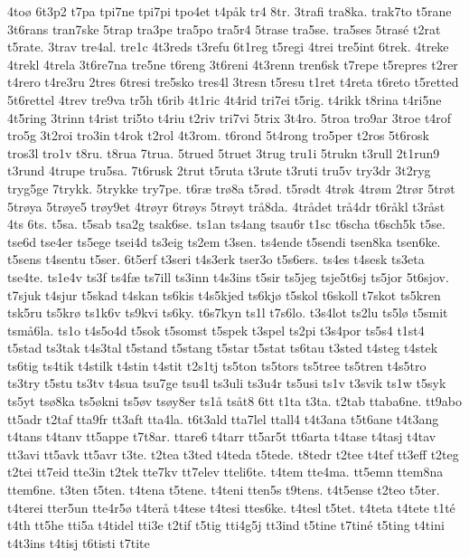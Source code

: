 {4to^^f8
6t3p2
t7pa
tpi7ne
tpi7pi
tpo4et
t4p^^e5k
tr4
8tr.
3trafi
tra8ka.
trak7to
t5rane
3t6rans
tran7ske
5trap
tra3pe
tra5po
tra5r4
5trase
tra5se.
tra5ses
5tras^^e9
t2rat
t5rate.
3trav
tre4al.
tre1c
4t3reds
t3refu
6t1reg
t5regi
4trei
tre5int
6trek.
4treke
4trekl
4trela
3t6re7na
tre5ne
t6reng
3t6reni
4t3renn
tren6sk
t7repe
t5repres
t2rer
t4rero
t4re3ru
2tres
6tresi
tre5sko
tres4l
3tresn
t5resu
t1ret
t4reta
t6reto
t5retted
5t6rettel
4trev
tre9va
tr5h
t6rib
4t1ric
4t4rid
tri7ei
t5rig.
t4rikk
t8rina
t4ri5ne
4t5ring
3trinn
t4rist
tri5to
t4riu
t2riv
tri7vi
5trix
3t4ro.
5troa
tro9ar
3troe
t4rof
tro5g
3t2roi
tro3in
t4rok
t2rol
4t3rom.
t6rond
5t4rong
tro5per
t2ros
5t6rosk
tros3l
tro1v
t8ru.
t8rua
7trua.
5trued
5truet
3trug
tru1i
5trukn
t3rull
2t1run9
t3rund
4trupe
tru5sa.
7t6rusk
2trut
t5ruta
t3rute
t3ruti
tru5v
try3dr
3t2ryg
tryg5ge
7trykk.
5trykke
try7pe.
t6r^^e6
tr^^f88a
t5r^^f8d.
t5r^^f8dt
4tr^^f8k
4tr^^f8m
2tr^^f8r
5tr^^f8t
5tr^^f8ya
5tr^^f8ye5
tr^^f8y9et
4tr^^f8yr
6tr^^f8ys
5tr^^f8yt
tr^^e58da.
4tr^^e5det
tr^^e54dr
t6r^^e5kl
t3r^^e5st
4ts
6ts.
t5sa.
t5sab
tsa2g
tsak6se.
ts1an
ts4ang
tsau6r
t1sc
t6scha
t6sch5k
t5se.
tse6d
tse4er
ts5ege
tsei4d
ts3eig
ts2em
t3sen.
ts4ende
t5sendi
tsen8ka
tsen6ke.
t5sens
t4sentu
t5ser.
6t5erf
t3seri
t4s3erk
tser3o
t5s6ers.
ts4es
t4sesk
ts3eta
tse4te.
ts1e4v
ts3f
ts4f^^e6
ts7ill
ts3inn
t4s3ins
t5sir
ts5jeg
tsje5t6sj
ts5jor
5t6sjov.
t7sjuk
t4sjur
t5skad
t4skan
ts6kis
t4s5kjed
ts6kj^^f8
t5skol
t6skoll
t7skot
ts5kren
tsk5ru
ts5kr^^f8
ts1k6v
ts9kvi
ts6ky.
t6s7kyn
ts1l
t7s6lo.
t3s4lot
ts2lu
ts5l^^f8
t5smit
tsm^^e56la.
ts1o
t4s5o4d
t5sok
t5somst
t5spek
t3spel
ts2pi
t3s4por
ts5s4
t1st4
t5stad
ts3tak
t4s3tal
t5stand
t5stang
t5star
t5stat
ts6tau
t3sted
t4steg
t4stek
ts6tig
ts4tik
t4stilk
t4stin
t4stit
t2s1tj
ts5ton
ts5tors
ts5tree
ts5tren
t4s5tro
ts3try
t5stu
ts3tv
t4sua
tsu7ge
tsu4l
ts3uli
ts3u4r
ts5usi
ts1v
t3svik
ts1w
t5syk
ts5yt
ts^^f88ka
ts5^^f8kni
ts5^^f8v
ts^^f8y8er
ts1^^e5
ts^^e5t8
6tt
t1ta
t3ta.
t2tab
ttaba6ne.
tt9abo
tt5adr
t2taf
tta9fr
tt3aft
tta4la.
t6t3ald
tta7lel
ttall4
t4t3ana
t5t6ane
t4t3ang
t4tans
t4tanv
tt5appe
t7t8ar.
ttare6
t4tarr
tt5ar5t
tt6arta
t4tase
t4tasj
t4tav
tt3avi
tt5avk
tt5avr
t3te.
t2tea
t3ted
t4teda
t5tede.
t8tedr
t2tee
t4tef
tt3eff
t2teg
t2tei
tt7eid
tte3in
t2tek
tte7kv
tt7elev
tteli6te.
t4tem
tte4ma.
tt5emn
ttem8na
ttem6ne.
t3ten
t5ten.
t4tena
t5tene.
t4teni
tten5s
t9tens.
t4t5ense
t2teo
t5ter.
t4terei
tter5un
tte4r5^^f8
t4ter^^e5
t4tese
t4tesi
ttes6ke.
t4tesl
t5tet.
t4teta
t4tete
t1t^^e9
t4th
tt5he
tti5a
t4tidel
tti3e
t2tif
t5tig
tti4g5j
tt3ind
t5tine
t7tin^^e9
t5ting
t4tini
t4t3ins
t4tisj
t6tisti
t7tite
}

